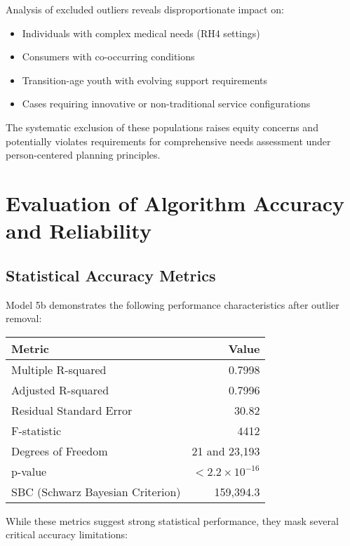 Analysis of excluded outliers reveals disproportionate impact on:
\begin{itemize}
    \item Individuals with complex medical needs (RH4 settings)
    \item Consumers with co-occurring conditions
    \item Transition-age youth with evolving support requirements
    \item Cases requiring innovative or non-traditional service configurations
\end{itemize}

The systematic exclusion of these populations raises equity concerns and potentially violates requirements for comprehensive needs assessment under person-centered planning principles.

\section{Evaluation of Algorithm Accuracy and Reliability}

\subsection{Statistical Accuracy Metrics}

Model 5b demonstrates the following performance characteristics after outlier removal:

\begin{center}
\begin{tabular}{|l|r|}
\hline
\textbf{Metric} & \textbf{Value} \\
\hline
Multiple R-squared & 0.7998 \\
Adjusted R-squared & 0.7996 \\
Residual Standard Error & 30.82 \\
F-statistic & 4412 \\
Degrees of Freedom & 21 and 23,193 \\
p-value & $< 2.2 \times 10^{-16}$ \\
SBC (Schwarz Bayesian Criterion) & 159,394.3 \\
\hline
\end{tabular}
\end{center}

While these metrics suggest strong statistical performance, they mask several critical accuracy limitations:

